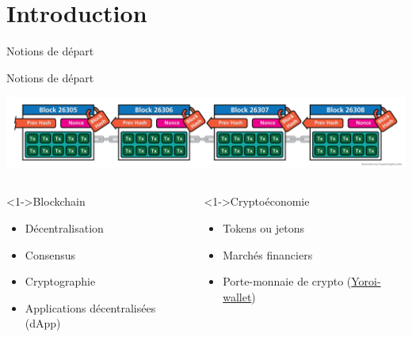 \documentclass[presentation]{beamer}
\begin{document}
\section{Introduction}
\label{sec:org6f536e9}
\begin{frame}[label={sec:org1959b3f}]{Notions de départ}
\begin{block}{Notions de départ}
\begin{center}
\includegraphics[width=\textwidth]{Pictures/cryptographics/anatomy-of-a-chain-1.png}
\end{center}

\begin{columns}
\begin{column}{0.54\columnwidth}
\begin{block}<1->{Blockchain}
\begin{itemize}
\item <2> Décentralisation
\item <2> Consensus
\item <2> Cryptographie
\item <2> Applications décentralisées (dApp)
\end{itemize}
\end{block}
\end{column}
\begin{column}{0.46\columnwidth}
\begin{block}<1->{Cryptoéconomie}
\begin{itemize}
\item <0>Tokens ou jetons
\item <0>Marchés financiers
\item <0>Porte-monnaie de crypto (\href{https://yoroi-wallet.com}{Yoroi-wallet})
\end{itemize}
\end{block}
\end{column}
\end{columns}
\end{block}
\end{frame}
\end{document}
